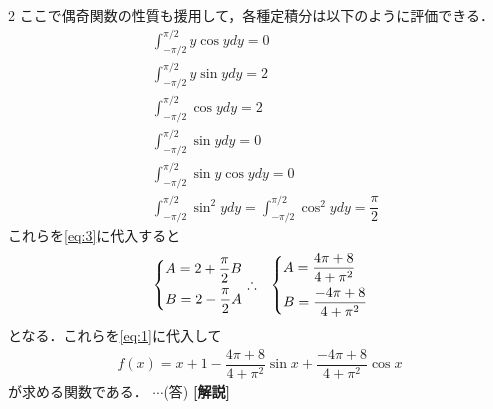 \documentclass[../../main.tex]{subfiles}
\begin{document}
\begin{multicols}{2}
  ここで偶奇関数の性質も援用して，各種定積分は以下のように評価できる．
  \begin{align}
    & \int_{-\pi/2}^{\pi/2} y \cos y dy = 0                                                 \\
    & \int_{-\pi/2}^{\pi/2} y \sin y dy = 2                                                 \\
    & \int_{-\pi/2}^{\pi/2} \cos y dy =  2                                                  \\
    & \int_{-\pi/2}^{\pi/2} \sin y dy = 0                                                   \\
    & \int_{-\pi/2}^{\pi/2} \sin y \cos y dy = 0                                            \\
    & \int_{-\pi/2}^{\pi/2} \sin^2 y dy = \int_{-\pi/2}^{\pi/2} \cos^2 y dy = \dfrac{\pi}{2}
  \end{align}
  これらを\cref{eq:3}に代入すると
  \begin{align}
    &
    \begin{dcases}
      A = 2 + \dfrac{\pi}{2} B \\
      B = 2 - \dfrac{\pi}{2} A
    \end{dcases}
    \therefore
    &
    \begin{dcases}
      A = \dfrac{4\pi+8}{4+\pi^2} \\
      B = \dfrac{-4\pi+8}{4+\pi^2}
    \end{dcases}
  \end{align}
  となる．これらを\cref{eq:1}に代入して
  \begin{align}
    f(x) = x+1 - \dfrac{4\pi+8}{4+\pi^2} \sin x + \dfrac{-4\pi+8}{4+\pi^2} \cos x
  \end{align}
  が求める関数である．    $\cdots$(答)
  {\bf [解説]}

  \newpage
\end{multicols}
\end{document}
